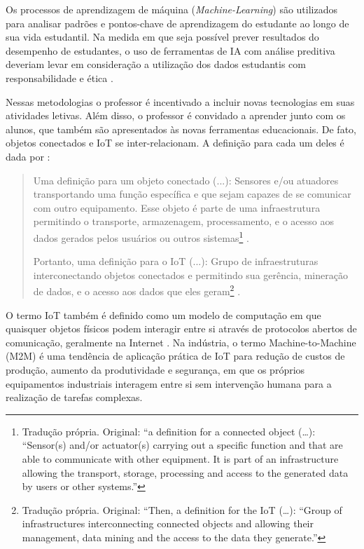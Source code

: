 \documentclass[portuguese]{textolivre}
\begin{document}
Os processos de aprendizagem de máquina (\textit{Machine-Learning}) são utilizados para analisar padrões e pontos-chave de aprendizagem do estudante ao longo de sua vida estudantil. Na medida em que seja possível prever resultados do desempenho de estudantes, o uso de ferramentas de IA com análise preditiva deveriam levar em consideração a utilização dos dados estudantis com responsabilidade e ética \cite{pelletier_2021_2021}.

Nessas metodologias o professor é incentivado a incluir novas tecnologias em suas atividades letivas. Além disso, o professor é convidado a aprender junto com os alunos, que também são apresentados às novas ferramentas educacionais. De fato, objetos conectados e IoT se inter-relacionam. A definição para cada um deles é dada por \textcite{dorsemaine_internet_2015}:

\begin{quote}
    Uma definição para um objeto conectado (...): Sensores e/ou atuadores transportando uma função específica e que sejam capazes de se comunicar com outro equipamento. Esse objeto é parte de uma infraestrutura permitindo o transporte, armazenagem, processamento, e o acesso aos dados gerados pelos usuários ou outros sistemas\footnote{Tradução própria. Original: “a definition for a connected object (…): “Sensor(s) and/or actuator(s) carrying out a specific function and that are able to communicate with other equipment. It is part of an infrastructure allowing the transport, storage, processing and access to the generated data by users or other systems.”} \cite[p. 73]{dorsemaine_internet_2015}. 
    
    Portanto, uma definição para o IoT (...): Grupo de infraestruturas interconectando objetos conectados e permitindo sua gerência, mineração de dados, e o acesso aos dados que eles geram\footnote{Tradução própria. Original: “Then, a definition for the IoT (…): “Group of infrastructures interconnecting connected objects and allowing their management, data mining and the access to the data they generate.”} \cite[p. 73]{dorsemaine_internet_2015}.
\end{quote}

O termo IoT também é definido como um modelo de computação em que quaisquer objetos físicos podem interagir entre si através de protocolos abertos de comunicação, geralmente na Internet \cite{patel_internet_2016}. Na indústria, o termo Machine-to-Machine (M2M) \cite{gazis_survey_2017} é uma tendência de aplicação prática de IoT para redução de custos de produção, aumento da produtividade e segurança, em que os próprios equipamentos industriais interagem entre si sem intervenção humana para a realização de tarefas complexas. 
\end{document}
